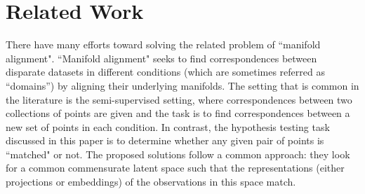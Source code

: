 \documentclass[12pt]{article} %
\begin{document}
    

\section{Related Work \label{sec:RelatedWork}}
There have many efforts toward solving the related problem of ``manifold alignment". ``Manifold alignment" seeks to find correspondences between disparate datasets in different conditions (which are  sometimes referred as ``domains'') by aligning their underlying manifolds. The setting that is common in the literature  is the semi-supervised setting\cite{Ham2005a}, where  correspondences between two collections of points  are given and the task is to find correspondences between a new set of points in each condition. In contrast, the hypothesis testing task discussed in this paper is to determine whether any given pair of points is ``matched" or not. The proposed solutions\cite{Wang2008,Zhai2010,3wayNMDS}
 follow a common approach: they look for a common commensurate latent space such that the representations (either projections or embeddings) of the observations in this space match.
\end{document}
